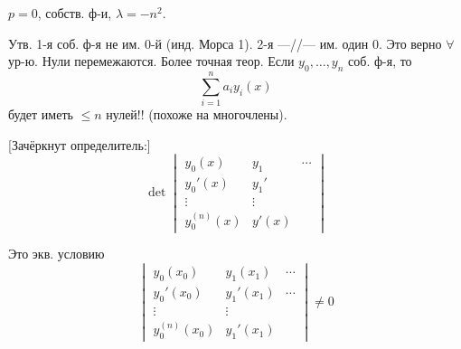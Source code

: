 \par\noindent\begin{minipage}{\linewidth}
$p=0$, собств. ф-и, $\lambda=-n^2$.
\end{minipage}\par
Утв. 1-я соб. ф-я не им. 0-й (инд. Морса 1).
2-я —//— им. один 0.
Это верно $\forall$ ур-ю.
Нули перемежаются.
Более точная теор. Если $y_0,\ldots,y_n$ соб. ф-я,
то
\begin{equation*}
\sum_{i=1}^{n}a_i y_i(x)
\end{equation*}
будет иметь $\leq n$ нулей!!
(похоже на многочлены).
\par\noindent\begin{minipage}{\linewidth}
[Зачёркнут определитель:]
\begin{equation*}
\det\begin{vmatrix}
y_0(x)&y_1&\cdots\\
y_0'(x)&y_1'&\\
\vdots&\vdots&\\
y_0^{(n)}(x)&y'(x)&
\end{vmatrix}
\end{equation*}
\end{minipage}\par
\par\noindent\begin{minipage}{\linewidth}
Это экв. условию
\begin{equation*}
\begin{vmatrix}
y_0(x_0)&y_1(x_1)&\cdots\\
y_0'(x_0)&y_1'(x_1)&\cdots\\
\vdots&\vdots&\\
y_0^{(n)}(x_0)&y_1'(x_1)&
\end{vmatrix}\neq0
\end{equation*}
\end{minipage}\par
